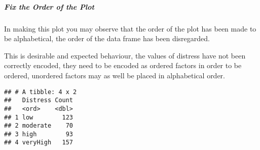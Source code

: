 \documentclass[
]{article}
\newenvironment{Shaded}{\begin{snugshade}}{\end{snugshade}}
\newcommand{\CommentTok}[1]{\textcolor[rgb]{0.56,0.35,0.01}{\textit{#1}}}
\newcommand{\DataTypeTok}[1]{\textcolor[rgb]{0.13,0.29,0.53}{#1}}
\newcommand{\KeywordTok}[1]{\textcolor[rgb]{0.13,0.29,0.53}{\textbf{#1}}}
\newcommand{\NormalTok}[1]{#1}
\newcommand{\OperatorTok}[1]{\textcolor[rgb]{0.81,0.36,0.00}{\textbf{#1}}}
\newcommand{\OtherTok}[1]{\textcolor[rgb]{0.56,0.35,0.01}{#1}}
\newcommand{\StringTok}[1]{\textcolor[rgb]{0.31,0.60,0.02}{#1}}
\begin{document}
\hypertarget{fix-the-order-of-the-plot}{%
\subparagraph{Fix the Order of the
Plot}\label{fix-the-order-of-the-plot}}

In making this plot you may observe that the order of the plot has been
made to be alphabetical, the order of the data frame has been
disregarded.

This is desirable and expected behaviour, the values of distress have
not been correctly encoded, they need to be encoded as ordered factors
in order to be ordered, unordered factors may as well be placed in
alphabetical order.

\begin{Shaded}
\end{Shaded}

\begin{verbatim}
## # A tibble: 4 x 2
##   Distress Count
##   <ord>    <dbl>
## 1 low        123
## 2 moderate    70
## 3 high        93
## 4 veryHigh   157
\end{verbatim}

\begin{Shaded}
\end{Shaded}
\end{document}
